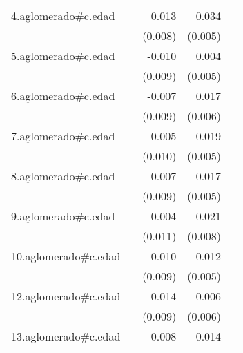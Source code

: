 {\begin{longtable}{l*{4}{D{.}{.}{-1}}}
\addlinespace
4.aglomerado#c.edad&                     &       0.013         &       0.034\sym{***}&                     \\
            &                     &     (0.008)         &     (0.005)         &                     \\
\addlinespace
5.aglomerado#c.edad&                     &      -0.010         &       0.004         &                     \\
            &                     &     (0.009)         &     (0.005)         &                     \\
\addlinespace
6.aglomerado#c.edad&                     &      -0.007         &       0.017\sym{**} &                     \\
            &                     &     (0.009)         &     (0.006)         &                     \\
\addlinespace
7.aglomerado#c.edad&                     &       0.005         &       0.019\sym{***}&                     \\
            &                     &     (0.010)         &     (0.005)         &                     \\
\addlinespace
8.aglomerado#c.edad&                     &       0.007         &       0.017\sym{***}&                     \\
            &                     &     (0.009)         &     (0.005)         &                     \\
\addlinespace
9.aglomerado#c.edad&                     &      -0.004         &       0.021\sym{**} &                     \\
            &                     &     (0.011)         &     (0.008)         &                     \\
\addlinespace
10.aglomerado#c.edad&                     &      -0.010         &       0.012\sym{*}  &                     \\
            &                     &     (0.009)         &     (0.005)         &                     \\
\addlinespace
12.aglomerado#c.edad&                     &      -0.014         &       0.006         &                     \\
            &                     &     (0.009)         &     (0.006)         &                     \\
\addlinespace
13.aglomerado#c.edad&                     &      -0.008         &       0.014\sym{**} &                     \\

\end{longtable}}
